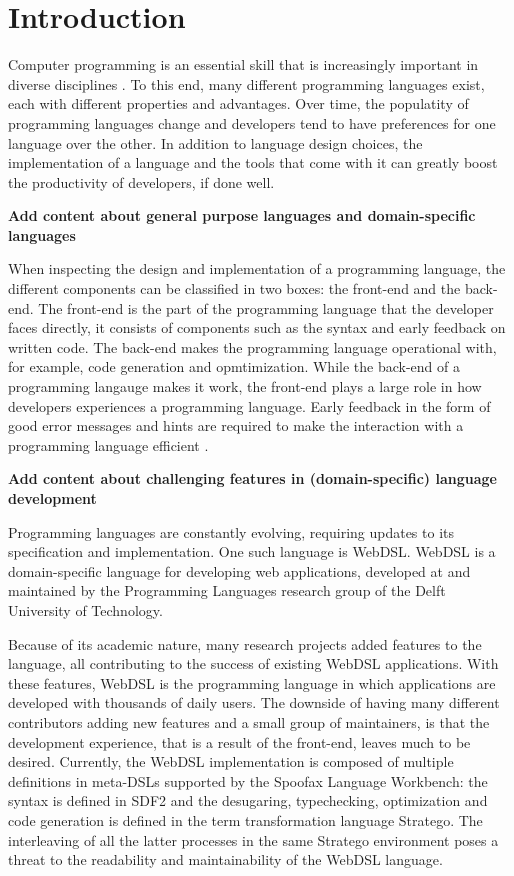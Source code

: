 
\chapter{\label{chap:introduction}Introduction}

  Computer programming is an essential skill that is increasingly important in diverse disciplines \autocite{Rafalski2019}. To this end, many different programming languages exist, each with different properties and advantages. Over time, the populatity of programming languages change and developers tend to have preferences for one language over the other. In addition to language design choices, the implementation of a language and the tools that come with it can greatly boost the productivity of developers, if done well.

  \textbf{Add content about general purpose languages and domain-specific languages}

  When inspecting the design and implementation of a programming language, the different components can be classified in two boxes: the front-end and the back-end. The front-end is the part of the programming language that the developer faces directly, it consists of components such as the syntax and early feedback on written code. The back-end makes the programming language operational with, for example, code generation and opmtimization. While the back-end of a programming langauge makes it work, the front-end plays a large role in how developers experiences a programming language. Early feedback in the form of good error messages and hints are required to make the interaction with a programming language efficient \autocite{Becker2019}.

  \textbf{Add content about challenging features in (domain-specific) language development}

  Programming languages are constantly evolving, requiring updates to its specification and implementation. One such language is WebDSL. WebDSL is a domain-specific language for developing web applications, developed at and maintained by the Programming Languages research group of the Delft University of Technology.

  Because of its academic nature, many research projects added features to the language, all contributing to the success of existing WebDSL applications. With these features, WebDSL is the programming language in which applications are developed with thousands of daily users. The downside of having many different contributors adding new features and a small group of maintainers, is that the development experience, that is a result of the front-end, leaves much to be desired. Currently, the WebDSL implementation is composed of multiple definitions in meta-DSLs supported by the Spoofax Language Workbench: the syntax is defined in SDF2 and the desugaring, typechecking, optimization and code generation is defined in the term transformation language Stratego. The interleaving of all the latter processes in the same Stratego environment poses a threat to the readability and maintainability of the WebDSL language.

